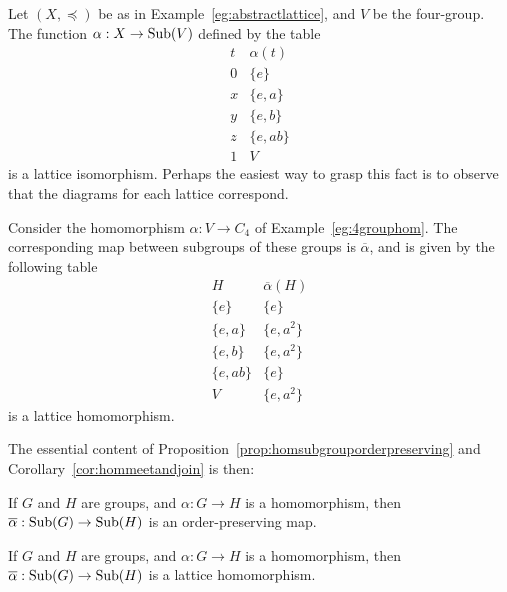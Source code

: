 \begin{example}
  Let $(X, \preceq)$ be as in Example~\ref{eg:abstractlattice}, and 
  $V$ be the four-group.
  The function $\alpha : X \to \operatorname{Sub}(V)$ defined by the table
  \[
    \begin{array}{cc}
      t & \alpha(t) \\
      \hline
      0 & \{e\} \\
      x & \{e, a\} \\
      y & \{e, b\} \\
      z & \{e, ab\} \\
      1 & V 
    \end{array}
  \]
  is a lattice isomorphism.  Perhaps the easiest way to grasp this 
  fact is to observe that the diagrams for each lattice correspond.
\end{example}


\begin{example}
  Consider the homomorphism $\alpha : V \to C_{4}$ of 
  Example~\ref{eg:4grouphom}.  The corresponding map between 
  subgroups of these groups is $\overline{\alpha}$, and is given by 
  the following table
  \[
    \begin{array}{cc}
      H & \overline{\alpha}(H) \\
      \hline
      \{e\} & \{e\} \\
      \{e, a\} & \{e, a^{2}\} \\
      \{e, b\} & \{e, a^{2}\} \\
      \{e, ab\} & \{e\} \\
      V & \{e, a^{2}\}
    \end{array}
  \]
  is a lattice homomorphism.
\end{example}

The essential content of
Proposition~\ref{prop:homsubgrouporderpreserving} and
Corollary~\ref{cor:hommeetandjoin} is then:

\begin{proposition}
  If $G$ and $H$ are groups, and $\alpha: G \to H$ is a homomorphism,
  then $\overline{\alpha} : \operatorname{Sub}(G) \to \operatorname{Sub}(H)$ is an
  order-preserving map.
\end{proposition}

\begin{corollary}\label{cor:grouphomtolathom}
  If $G$ and $H$ are groups, and $\alpha: G \to H$ is a homomorphism, 
  then $\overline{\alpha} : \operatorname{Sub}(G) \to \operatorname{Sub}(H)$ is a lattice 
  homomorphism.
\end{corollary}

